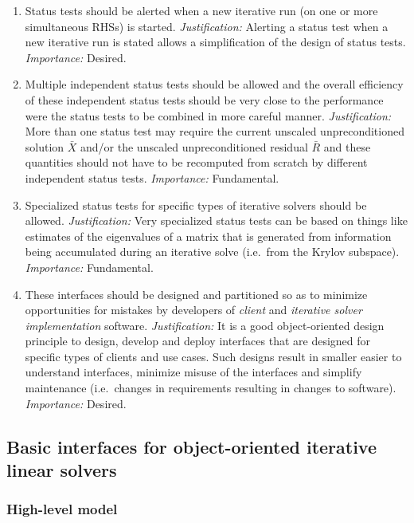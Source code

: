 \documentclass[pdf,ps2pdf,11pt]{SANDreport}
\begin{document}
\begin{enumerate}
\item
Status tests should be alerted when a new iterative run (on one or
more simultaneous RHSs) is started.  {}\textit{Justification:}
Alerting a status test when a new iterative run is stated allows a
simplification of the design of status tests.  {}\textit{Importance:}
Desired.

\item
Multiple independent status tests should be allowed and the overall
efficiency of these independent status tests should be very close to
the performance were the status tests to be combined in more careful
manner.  {}\textit{Justification:} More than one status test may
require the current unscaled unpreconditioned solution $\bar{X}$
and/or the unscaled unpreconditioned residual $\bar{R}$ and these
quantities should not have to be recomputed from scratch by different
independent status tests.  {}\textit{Importance:} Fundamental.

\item
Specialized status tests for specific types of iterative solvers
should be allowed.  {}\textit{Justification:} Very specialized status
tests can be based on things like estimates of the eigenvalues of a
matrix that is generated from information being accumulated during an
iterative solve (i.e.~from the Krylov subspace).  {}\textit{Importance:} Fundamental.

\item
These interfaces should be designed and partitioned so as to minimize
opportunities for mistakes by developers of {}\textit{client} and
{}\textit{iterative solver implementation} software.
{}\textit{Justification:} It is a good object-oriented design
principle to design, develop and deploy interfaces that are designed
for specific types of clients and use cases.  Such designs result in
smaller easier to understand interfaces, minimize misuse of the
interfaces and simplify maintenance (i.e.~changes in requirements
resulting in changes to software).  {}\textit{Importance:} Desired.

\end{enumerate}

\subsection{Basic interfaces for object-oriented iterative linear solvers}

\subsubsection{High-level model}
\end{document}
